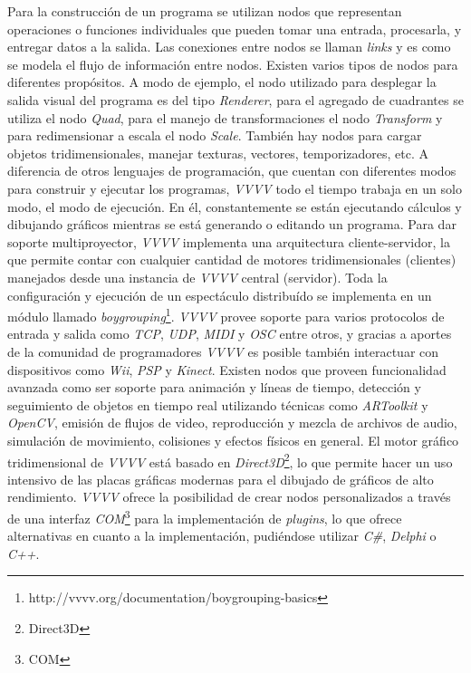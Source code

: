 Para la construcción de un programa se utilizan nodos que representan operaciones o funciones individuales que pueden tomar una entrada, procesarla, y entregar datos a la salida. Las conexiones entre nodos se llaman \emph{links} y es como se modela el flujo de información entre nodos.
Existen varios tipos de nodos para diferentes propósitos. A modo de ejemplo, el nodo utilizado para desplegar la salida visual del programa es del tipo \emph{Renderer}, para el agregado de cuadrantes se utiliza el nodo \emph{Quad}, para el manejo de transformaciones el nodo \emph{Transform} y para redimensionar a escala el nodo \emph{Scale}. También hay nodos para cargar objetos tridimensionales, manejar texturas, vectores, temporizadores, etc.
A diferencia de otros lenguajes de programación, que cuentan con diferentes modos para construir y ejecutar los programas, \emph{VVVV} todo el tiempo trabaja en un solo modo, el modo de ejecución. En él, constantemente se están ejecutando cálculos y dibujando gráficos mientras se está generando o editando un programa.
Para dar soporte multiproyector, \emph{VVVV} implementa una arquitectura cliente-servidor, la que permite contar con cualquier cantidad de motores tridimensionales (clientes) manejados desde una instancia de \emph{VVVV} central (servidor). Toda la configuración y ejecución de un espectáculo distribuído se implementa en un módulo llamado \emph{boygrouping}\footnote{http://vvvv.org/documentation/boygrouping-basics}.
\emph{VVVV} provee soporte para varios protocolos de entrada y salida como \emph{TCP}, \emph{UDP}, \emph{MIDI} y \emph{OSC} entre otros, y gracias a aportes de la comunidad de programadores \emph{VVVV} es posible también interactuar con dispositivos como \emph{Wii}, \emph{PSP} y \emph{Kinect}. Existen nodos que proveen funcionalidad avanzada como ser soporte para animación y líneas de tiempo, detección y seguimiento de objetos en tiempo real utilizando técnicas como \emph{ARToolkit} y \emph{OpenCV}, emisión de flujos de video, reproducción y mezcla de archivos de audio, simulación de movimiento, colisiones y efectos físicos en general.
El motor gráfico tridimensional de \emph{VVVV} está basado en \emph{Direct3D}\footnote{Direct3D}, lo que permite hacer un uso intensivo de las placas gráficas modernas para el dibujado de gráficos de alto rendimiento.
\emph{VVVV} ofrece la posibilidad de crear nodos personalizados a través de una interfaz \emph{COM}\footnote{COM} para la implementación de \emph{plugins}, lo que ofrece alternativas en cuanto a la implementación, pudiéndose utilizar \emph{C\#}, \emph{Delphi} o \emph{C++}.

